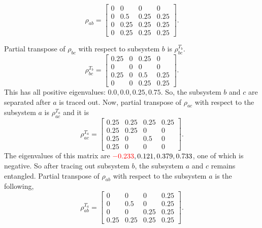 \documentclass{amsart}
\theoremstyle{plain}
\theoremstyle{definition}
\theoremstyle{plain}
\begin{document}
	\begin{equation*}
		\rho_{ab} = \left[\begin{matrix}0 & 0 & 0 & 0\\0 & 0.5 & 0.25 & 0.25\\0 & 0.25 & 0.25 & 0.25\\0 & 0.25 & 0.25 & 0.25\end{matrix}\right].
	\end{equation*}

	Partial transpose of $\rho_{bc}$ with respect to subsystem $b $ is $\rho^{T_b}_{bc}$.
	\begin{equation*}
		\rho^{T_b}_{bc} = \left[\begin{matrix}0.25 & 0 & 0.25 & 0\\0 & 0 & 0 & 0\\0.25 & 0 & 0.5 & 0.25\\0 & 0 & 0.25 & 0.25\end{matrix}\right].
	\end{equation*}
	This has all positive eigenvalues: $0.0, 0.0, 0.25, 0.75$. So, the subsystem $b$ and $c$ are separated after $a$ is traced out. Now, partial transpose of $\rho_{ac}$ with respect to the subsystem $a$ is $\rho^{T_a}_{ac}$ and it is
	\begin{equation*}
		\rho^{T_a}_{ac} = \left[\begin{matrix}0.25 & 0.25 & 0.25 & 0.25\\0.25 & 0.25 & 0 & 0\\0.25 & 0 & 0.5 & 0\\0.25 & 0 & 0 & 0\end{matrix}\right].
	\end{equation*}
	The eigenvalues of this matrix are $\textcolor{red}{-0.233}, 0.121, 0.379, 0.733$, one of which is negative. So after tracing out subsystem $b$, the subsystem $a$ and $c$ remains entangled.
	Partial transpose of $\rho_{ab}$ with respect to the subsystem $a$ is the following,
	\begin{equation*}
		\rho^{T_a}_{ab} = \left[\begin{matrix}0 & 0 & 0 & 0.25\\0 & 0.5 & 0 & 0.25\\0 & 0 & 0.25 & 0.25\\0.25 & 0.25 & 0.25 & 0.25\end{matrix}\right].
	\end{equation*}
\end{document}

